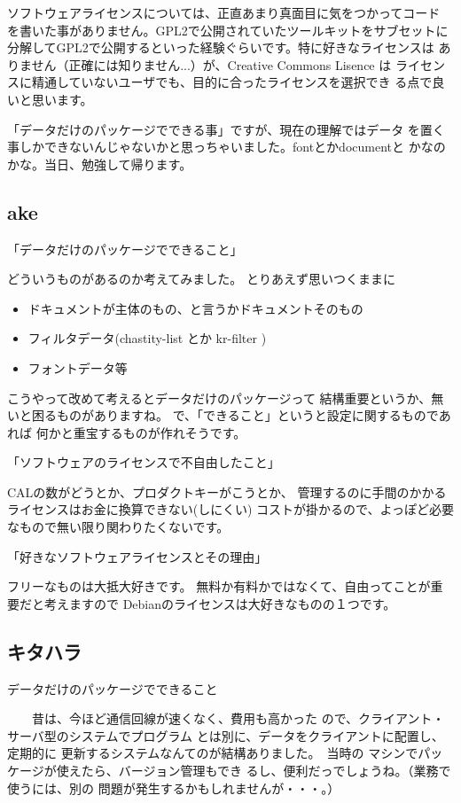 \documentclass[mingoth,a4paper]{jsarticle}
\begin{document}
\begin{multicols}{2}
{ソフトウェアライセンスについては、正直あまり真面目に気をつかってコード
を書いた事がありません。GPL2で公開されていたツールキットをサブセットに
分解してGPL2で公開するといった経験ぐらいです。特に好きなライセンスは
ありません（正確には知りません...）が、Creative Commons Lisence は
ライセンスに精通していないユーザでも、目的に合ったライセンスを選択でき
る点で良いと思います。

「データだけのパッケージでできる事」ですが、現在の理解ではデータ
を置く事しかできないんじゃないかと思っちゃいました。fontとかdocumentと
かなのかな。当日、勉強して帰ります。


\subsection{ake}

「データだけのパッケージでできること」

どういうものがあるのか考えてみました。
とりあえず思いつくままに
\begin{itemize}
 \item  ドキュメントが主体のもの、と言うかドキュメントそのもの
 \item  フィルタデータ(chastity-list とか kr-filter )
 \item  フォントデータ等
\end{itemize}
こうやって改めて考えるとデータだけのパッケージって
結構重要というか、無いと困るものがありますね。
で、「できること」というと設定に関するものであれば
何かと重宝するものが作れそうです。

「ソフトウェアのライセンスで不自由したこと」

CALの数がどうとか、プロダクトキーがこうとか、
管理するのに手間のかかるライセンスはお金に換算できない(しにくい)
コストが掛かるので、よっぽど必要なもので無い限り関わりたくないです。

「好きなソフトウェアライセンスとその理由」

フリーなものは大抵大好きです。
無料か有料かではなくて、自由ってことが重要だと考えますので
Debianのライセンスは大好きなものの１つです。

\subsection{キタハラ}

データだけのパッケージでできること

　　昔は、今ほど通信回線が速くなく、費用も高かった
ので、クライアント・サーバ型のシステムでプログラム
とは別に、データをクライアントに配置し、定期的に
更新するシステムなんてのが結構ありました。　当時の
マシンでパッケージが使えたら、バージョン管理もでき
るし、便利だっでしょうね。（業務で使うには、別の
問題が発生するかもしれませんが・・・。）

}
\end{multicols}
\end{document}
